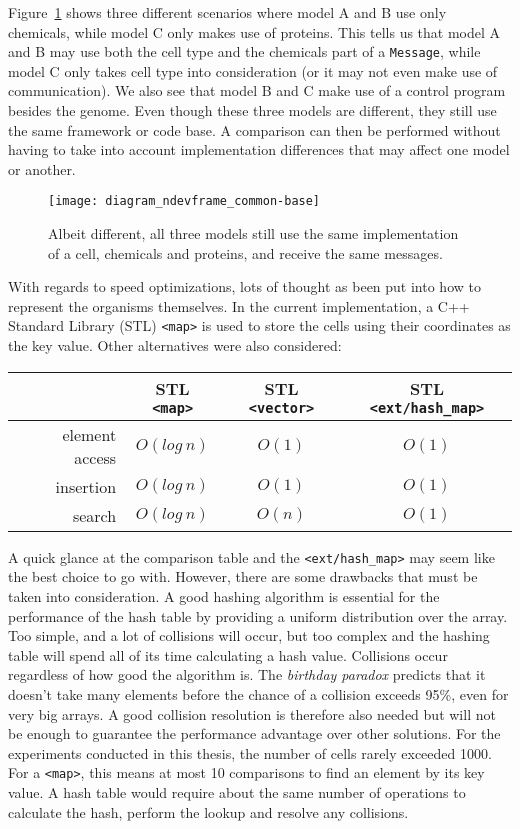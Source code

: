 Figure~\ref{fig:diagram_ndevframe_common-base} shows three different scenarios where model A and B use only chemicals, while model C only makes use of proteins. This tells us that model A and B may use both the cell type and the chemicals part of a \texttt{Message}, while model C only takes cell type into consideration (or it may not even make use of communication). We also see that model B and C make use of a control program besides the genome. Even though these three models are different, they still use the same framework or code base. A comparison can then be performed without having to take into account implementation differences that may affect one model or another.

\begin{figure}[!ht]
	\centering
	\texttt{[image: diagram\_ndevframe\_common-base]}
	\caption{Albeit different, all three models still use the same implementation of a cell, chemicals and proteins, and receive the same messages.}
	\label{fig:diagram_ndevframe_common-base}
\end{figure}

With regards to speed optimizations, lots of thought as been put into how to represent the organisms themselves. In the current implementation, a C++ Standard Library (STL) \texttt{<map>} is used to store the cells using their coordinates as the key value. Other alternatives were also considered:

\begin{center}
	\begin{tabular}{ r | c | c | c }
		~ & STL \texttt{<map>} & STL \texttt{<vector>} & STL \texttt{<ext/hash\_map>} \\
		\hline
		element access & $O(log~n)$ & $O(1)$ & $O(1)$ \\
		\hline
		insertion & $O(log~n)$ & $O(1)$ & $O(1)$ \\
		\hline
		search & $O(log~n)$ & $O(n)$ & $O(1)$ \\
	\end{tabular}
	\label{tbl:speed}
\end{center}

A quick glance at the comparison table and the \texttt{<ext/hash\_map>} may seem like the best choice to go with. However, there are some drawbacks that must be taken into consideration. A good hashing algorithm is essential for the performance of the hash table by providing a uniform distribution over the array. Too simple, and a lot of collisions will occur, but too complex and the hashing table will spend all of its time calculating a hash value. Collisions occur regardless of how good the algorithm is. The \emph{birthday paradox} predicts that it doesn't take many elements before the chance of a collision exceeds 95\%, even for very big arrays. A good collision resolution is therefore also needed but will not be enough to guarantee the performance advantage over other solutions. For the experiments conducted in this thesis, the number of cells rarely exceeded 1000. For a \texttt{<map>}, this means at most 10 comparisons to find an element by its key value. A hash table would require about the same number of operations to calculate the hash, perform the lookup and resolve any collisions.

